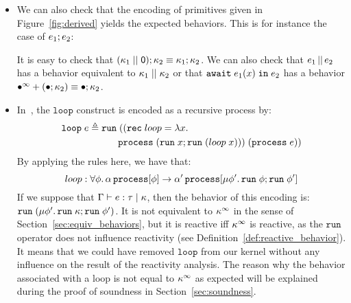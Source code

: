 \documentclass[9pt,preprint]{sigplanconf}
\newcommand{\deq}{\triangleq}
\begin{document}
\begin{itemize}
\item We can also check that the encoding of primitives given in Figure~\ref{fig:derived} yields the expected behaviors. This is for instance the case of $e_1 ; e_2$:
%
\par\nobreak{}%
It is easy to check that $(\kappa_1 \mid\mid \textsf{0}) ; \kappa_2  \equiv  \kappa_1 ; \kappa_2$.  We can also check that $e_1 \,||\, e_2$ has a behavior equivalent to $\kappa_1 \mid\mid \kappa_2$ or that $\mathtt{await}\; e_1(x) \;\mathtt{in}\; e_2$ has a behavior \mbox{$\bullet^\infty + (\bullet ; \kappa_2) \equiv \bullet ; \kappa_2$}. %

\item In~\cite{Mandel:2005}, the $\mathtt{loop}$ construct is encoded as a recursive process by:
%
\begin{align*}
\eloop{e} \deq &\mathid{run}(( \mathidl{rec} loop = 
     \elam{x}{ \\ &\qquad \eproc{(\eseq{\erun{x}}{\erun{(\eapp{loop}{x})}})}})\; (\eproc{e})) 
\end{align*}
%
By applying the rules here, we have that:
\[ loop: \forall \phi.\, \alpha \,\mathtt{process}[\phi] \rightarrow  \alpha' \,\mathtt{process}[\mu \phi'.\, \mathtt{run}\; \phi ; \mathtt{run}\; \phi'] \]
%
%
If we suppose that \mbox{$\Gamma \vdash e : \tau \mid \kappa$}, then the behavior of this encoding is:
 $\mathtt{run}\; (\mu \phi'.\, \mathtt{run}\; \kappa ; \mathtt{run}\; \phi')$.
It is not equivalent to $\kappa^\infty$ in the sense of Section~\ref{sec:equiv_behaviors}, but it is reactive iff $\kappa^\infty$ is reactive, as the $\mathtt{run}$ operator does not influence reactivity (see Definition~\ref{def:reactive_behavior}). It means that we could have removed $\mathtt{loop}$ from our kernel without any influence on the result of the reactivity analysis. The reason why the behavior associated with a loop is not equal to $\kappa^\infty$ as expected will be explained during the proof of soundness in Section~\ref{sec:soundness}.


\end{itemize}
\end{document}
